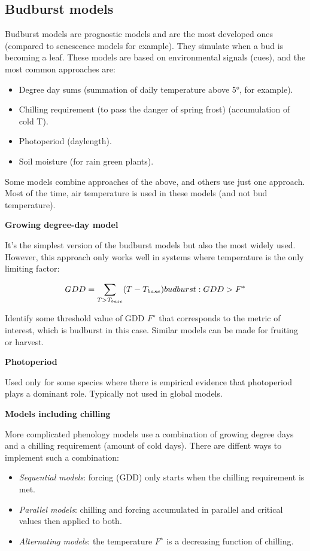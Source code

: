 \documentclass[12pt,oneside]{book}
\providecommand{\tightlist}{%
  \setlength{\itemsep}{0pt}\setlength{\parskip}{0pt}}
\begin{document}
\subsection{Budburst models}\label{budburst-models}

Budburst models are prognostic models and are the most developed ones
(compared to senescence models for example). They simulate when a bud is
becoming a leaf. These models are based on environmental signals (cues),
and the most common approaches are:

\begin{itemize}
\tightlist
\item
  Degree day sums (summation of daily temperature above 5°, for
  example).
\item
  Chilling requirement (to pass the danger of spring frost)
  (accumulation of cold T).
\item
  Photoperiod (daylength).
\item
  Soil moisture (for rain green plants).
\end{itemize}

Some models combine approaches of the above, and others use just one
approach. Most of the time, air temperature is used in these models (and
not bud temperature).

\textbf{Growing degree-day model}

It's the simplest version of the budburst models but also the most
widely used. However, this approach only works well in systems where
temperature is the only limiting factor:

\[
GDD = \sum_{T>T_{base}}(T-T_{base}) \\
budburst:GDD>F^*
\]

Identify some threshold value of GDD \(F^∗\) that corresponds to the
metric of interest, which is budburst in this case. Similar models can
be made for fruiting or harvest.

\textbf{Photoperiod}

Used only for some species where there is empirical evidence that
photoperiod plays a dominant role. Typically not used in global models.

\textbf{Models including chilling}

More complicated phenology models use a combination of growing degree
days and a chilling requirement (amount of cold days). There are diffent
ways to implement such a combination:

\begin{itemize}
\item
  \emph{Sequential models}: forcing (GDD) only starts when the chilling
  requirement is met.
\item
  \emph{Parallel models}: chilling and forcing accumulated in parallel
  and critical values then applied to both.
\item
  \emph{Alternating models}: the temperature \(F^∗\) is a decreasing
  function of chilling.
\end{itemize}
\end{document}
